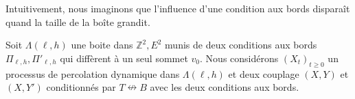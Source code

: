 \documentclass[titlepage,a4paper,12pt]{article}
\newcounter{prop}
\begin{document}
Intuitivement, nous imaginons que l'influence d'une condition aux bords disparaît quand la taille de la boîte grandit. %

Soit $\Lambda(\ell,h)$ une boite dans $\mathbb{Z}^2,E^2$ munis de deux conditions aux bords $\Pi_{\ell,h}, \Pi'_{\ell,h}$ qui diffèrent à un seul sommet $v_0$. Nous considérons $(X_t)_{t\geqslant 0}$ un processus de percolation dynamique dans $\Lambda(\ell,h)$ et deux couplage $(X,Y)$ et $(X,Y')$ conditionnés par $T\nleftrightarrow B$ avec les deux conditions aux bords.
\end{document}
